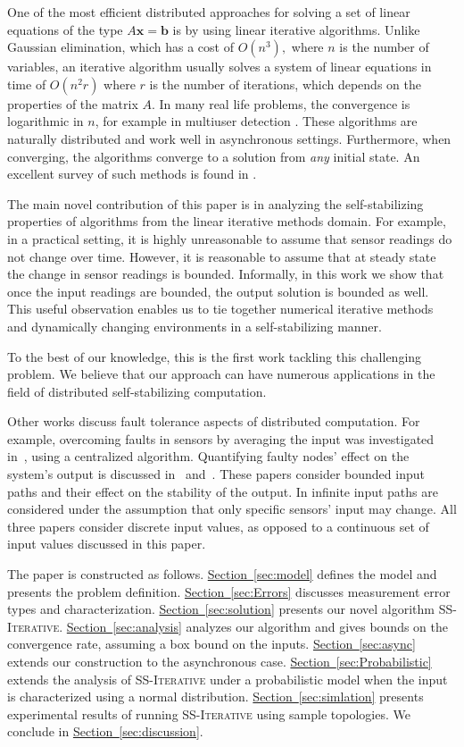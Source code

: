\documentclass[preprint,12pt]{elsarticle}
\newcommand{\namedref}[2]{\hyperref[#2]{#1~\ref*{#2}}}
\newcommand{\sectionref}[1]{\namedref{Section}{#1}}
\newcommand{\syncAlg}{\textsc{SS-Iterative}\xspace}
\newcommand{\xx}{\mathbf{x}}
\newcommand{\bb}{\mathbf{b}}
\begin{document}
One of the most efficient distributed approaches for solving a set
of linear equations of the type $A\xx = \bb$ is by using linear
iterative algorithms. Unlike Gaussian elimination, which has a
cost of $O(n^3),$ where $n$ is the number of variables, an
iterative algorithm usually solves a system of linear equations in
time of $O(n^2r)$ where $r$ is the number of iterations, which depends
on the properties of the matrix $A$. In many real life problems, the convergence
is logarithmic in $n$, for example in multiuser detection \cite{Allerton}.
These algorithms are naturally distributed and work well in asynchronous settings. Furthermore,
when converging, the algorithms converge to a solution from {\em
any} initial state. An excellent survey of such methods is found
in \cite{BibDB:BookBertsekasTsitsiklis}.

The main novel contribution of this paper is in analyzing
the self-stabilizing properties of
algorithms from the linear iterative methods domain. For example, in a practical setting, it is
highly unreasonable to assume that sensor readings do not change
over time. However, it is reasonable to assume that at steady
state the change in sensor readings is bounded. Informally, in
this work we show that once the input readings are bounded, the
output solution is bounded as well. This useful observation
enables us to tie together numerical iterative methods and
dynamically changing environments in a self-stabilizing manner.

To the best of our knowledge, this is the
first work tackling this challenging problem. We believe that our
approach can have numerous applications in the field of
distributed self-stabilizing computation.

Other works discuss fault tolerance aspects of distributed
computation. For example, overcoming faults in sensors by
averaging the input was investigated in~\cite{SensorFailures},
using a centralized algorithm. Quantifying faulty nodes'
effect on the system's output is discussed in~\cite{BinaryRept}
and~\cite{MultiValRept}. These papers consider bounded input paths
and their effect on the stability of the output. In
\cite{RepCons-PODC08} infinite input paths are considered under
the assumption that only specific sensors' input may change. All
three papers consider discrete input values, as opposed to a
continuous set of input values discussed in this paper.


The paper is constructed as follows.
\sectionref{sec:model} defines the model and presents the problem definition. \sectionref{sec:Errors} discusses measurement error types and characterization. \sectionref{sec:solution}
presents our novel algorithm \syncAlg. \sectionref{sec:analysis}
analyzes our algorithm and gives bounds on the convergence rate, assuming a box bound on the inputs. \sectionref{sec:async} extends our construction to the asynchronous case. \sectionref{sec:Probabilistic} extends the
analysis of \syncAlg under a probabilistic model when the input is characterized using a normal distribution.
\sectionref{sec:simlation} presents experimental results of
running \syncAlg using sample topologies. We conclude in
\sectionref{sec:discussion}.
\end{document}
